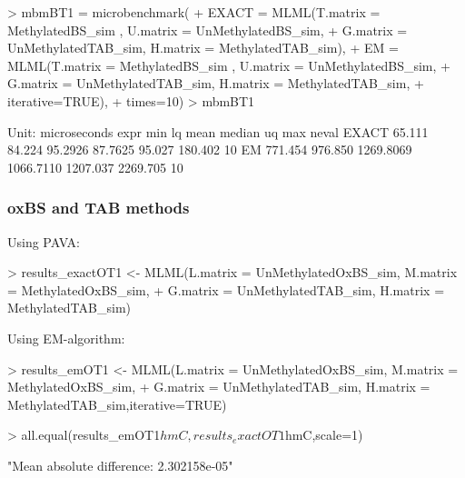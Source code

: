 \documentclass{article}
\begin{document}
\begin{Schunk}
\begin{Sinput}
>  mbmBT1 = microbenchmark(
+     EXACT = MLML(T.matrix = MethylatedBS_sim , U.matrix = UnMethylatedBS_sim,
+                  G.matrix = UnMethylatedTAB_sim, H.matrix = MethylatedTAB_sim),
+     EM =    MLML(T.matrix = MethylatedBS_sim , U.matrix = UnMethylatedBS_sim,
+                  G.matrix = UnMethylatedTAB_sim, H.matrix = MethylatedTAB_sim,
+                  iterative=TRUE),
+     times=10)
>  mbmBT1
\end{Sinput}
\begin{Soutput}
Unit: microseconds
  expr     min      lq      mean    median       uq      max neval
 EXACT  65.111  84.224   95.2926   87.7625   95.027  180.402    10
    EM 771.454 976.850 1269.8069 1066.7110 1207.037 2269.705    10
\end{Soutput}
\end{Schunk}


\subsubsection{oxBS and TAB methods}

 Using PAVA:
\begin{Schunk}
\begin{Sinput}
>  results_exactOT1 <- MLML(L.matrix = UnMethylatedOxBS_sim, M.matrix = MethylatedOxBS_sim,
+  G.matrix = UnMethylatedTAB_sim, H.matrix = MethylatedTAB_sim)
\end{Sinput}
\end{Schunk}

 Using EM-algorithm:
\begin{Schunk}
\begin{Sinput}
>  results_emOT1 <- MLML(L.matrix = UnMethylatedOxBS_sim, M.matrix = MethylatedOxBS_sim,
+  G.matrix = UnMethylatedTAB_sim, H.matrix = MethylatedTAB_sim,iterative=TRUE)
\end{Sinput}
\end{Schunk}


\begin{Schunk}
\begin{Sinput}
>  all.equal(results_emOT1$hmC,results_exactOT1$hmC,scale=1)
\end{Sinput}
\begin{Soutput}
[1] "Mean absolute difference: 2.302158e-05"
\end{Soutput}
\end{Schunk}
\end{document}
